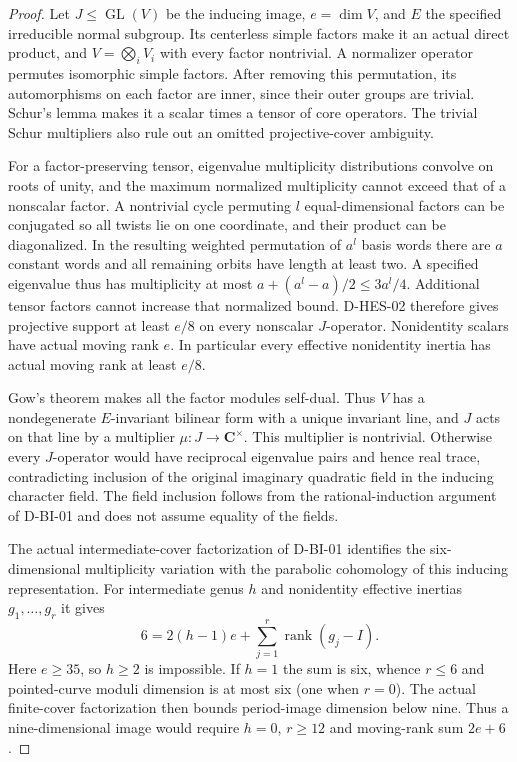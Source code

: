\begin{proof}
Let $J\le\operatorname{GL}(V)$ be the inducing image, $e=\dim V$, and
$E$ the specified irreducible normal subgroup. Its centerless simple
factors make it an actual direct product, and
$V=\bigotimes_iV_i$ with every factor nontrivial. A normalizer operator
permutes isomorphic simple factors. After removing this permutation,
its automorphisms on each factor are inner, since their outer groups
are trivial. Schur's lemma makes it a scalar times a tensor of core
operators. The trivial Schur multipliers also rule out an omitted
projective-cover ambiguity.

For a factor-preserving tensor, eigenvalue multiplicity distributions
convolve on roots of unity, and the maximum normalized multiplicity
cannot exceed that of a nonscalar factor. A nontrivial cycle permuting
$l$ equal-dimensional factors can be conjugated so all twists lie on
one coordinate, and their product can be diagonalized. In the resulting
weighted permutation of $a^l$ basis words there are $a$ constant words
and all remaining orbits have length at least two. A specified
eigenvalue thus has multiplicity at most
$a+(a^l-a)/2\le3a^l/4$. Additional tensor factors cannot increase that
normalized bound. D-HES-02 therefore gives projective support at least
$e/8$ on every nonscalar $J$-operator. Nonidentity scalars have actual
moving rank $e$. In particular every effective nonidentity inertia has
actual moving rank at least $e/8$.

Gow's theorem makes all the factor modules self-dual. Thus $V$ has a
nondegenerate $E$-invariant bilinear form with a unique invariant line,
and $J$ acts on that line by a multiplier $\mu:J\to\mathbf C^\times$.
This multiplier is nontrivial. Otherwise every $J$-operator would have
reciprocal eigenvalue pairs and hence real trace, contradicting inclusion
of the original imaginary quadratic field in the inducing character
field. The field inclusion follows from the rational-induction argument
of D-BI-01 and does not assume equality of the fields.

The actual intermediate-cover factorization of D-BI-01 identifies the
six-dimensional multiplicity variation with the parabolic cohomology
of this inducing representation. For intermediate genus $h$ and
nonidentity effective inertias $g_1,\ldots,g_r$ it gives
\[
                6=2(h-1)e+\sum_{j=1}^r\operatorname{rank}(g_j-I).
\tag{HES.10}
\]
Here $e\ge35$, so $h\ge2$ is impossible. If $h=1$ the sum is six,
whence $r\le6$ and pointed-curve moduli dimension is at most six
(one when $r=0$). The actual finite-cover factorization then bounds
period-image dimension below nine. Thus a nine-dimensional image would
require $h=0$, $r\ge12$ and moving-rank sum $2e+6$.


\end{proof}
